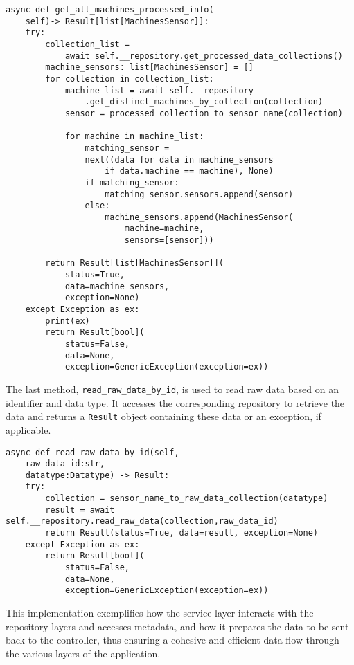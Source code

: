 \begin{verbatim}
async def get_all_machines_processed_info(
    self)-> Result[list[MachinesSensor]]:
    try:
        collection_list = 
            await self.__repository.get_processed_data_collections()
        machine_sensors: list[MachinesSensor] = []
        for collection in collection_list:
            machine_list = await self.__repository
                .get_distinct_machines_by_collection(collection)
            sensor = processed_collection_to_sensor_name(collection)

            for machine in machine_list:
                matching_sensor = 
                next((data for data in machine_sensors 
                    if data.machine == machine), None)
                if matching_sensor:
                    matching_sensor.sensors.append(sensor)
                else:
                    machine_sensors.append(MachinesSensor(
                        machine=machine,
                        sensors=[sensor]))
        
        return Result[list[MachinesSensor]](
            status=True,
            data=machine_sensors,
            exception=None)
    except Exception as ex:
        print(ex)
        return Result[bool](
            status=False,
            data=None,
            exception=GenericException(exception=ex)) 
\end{verbatim}

The last method, \texttt{read\_raw\_data\_by\_id}, is used to read raw data based on an identifier and data type. It accesses the corresponding repository to retrieve the data and returns a \texttt{Result} object containing these data or an exception, if applicable.
\begin{verbatim}
async def read_raw_data_by_id(self,
    raw_data_id:str,
    datatype:Datatype) -> Result:
    try:
        collection = sensor_name_to_raw_data_collection(datatype)
        result = await self.__repository.read_raw_data(collection,raw_data_id)
        return Result(status=True, data=result, exception=None) 
    except Exception as ex:
        return Result[bool](
            status=False,
            data=None,
            exception=GenericException(exception=ex)) 

\end{verbatim}
This implementation exemplifies how the service layer interacts with the repository layers and accesses metadata, and how it prepares the data to be sent back to the controller, thus ensuring a cohesive and efficient data flow through the various layers of the application.

